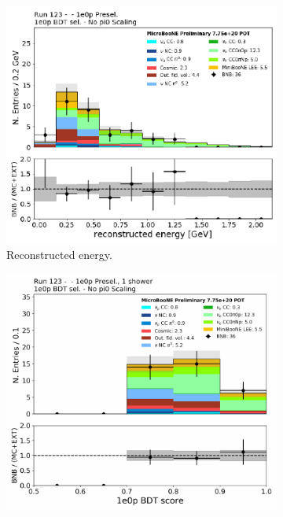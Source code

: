 \begin{figure}[H] 
\begin{center}
    \begin{subfigure}[b]{0.3\textwidth}
    \centering
    \includegraphics[width=1.00\textwidth]{Fakedata/set4/zp_postsel_recoe.pdf}
    \caption{\label{fig:fakedata:set4:zp_postsel_recoe} Reconstructed energy.}
    \end{subfigure}
    \begin{subfigure}[b]{0.3\textwidth}
    \centering
    \includegraphics[width=1.00\textwidth]{Fakedata/set4/zp_postsel_bdt.pdf}

\end{subfigure}
\end{center}
\end{figure}
